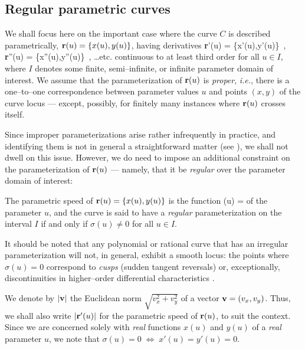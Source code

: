 \subsection{Regular parametric curves}

We shall focus here on the important case where the curve $C$
is described parametrically, ${\bf r}(u)=\{x(u),y(u)\}$, having
derivatives
\be \label{derivs}
{\bf r}'(u) = \{x'(u),y'(u)\} \,, \quad
{\bf r}''(u) = \{x''(u),y''(u)\} \,, \quad
\ldots {\rm etc.}
\ee
continuous to at least third order for all $u \in I$, where $I$
denotes some finite, semi--infinite, or infinite parameter domain
of interest. We assume that the parameterization of ${\bf r}(u)$
is {\it proper}, {\it i.e.}, there is a one--to--one correspondence
between parameter values $u$ and points $(x,y)$ of the curve
locus --- except, possibly, for finitely many instances where
${\bf r}(u)$ crosses itself.

Since improper parameterizations arise rather infrequently in
practice, and identifying them is not in general a straightforward
matter (see \cite{sederberg84,sederberg86}), we shall not dwell on
this issue. However, we do need to impose an additional constraint
on the parameterization of ${\bf r}(u)$ --- namely, that it be
{\it regular\/} over the parameter domain of interest:

\begin{dfn}
The parametric speed of ${\bf r}(u)=\{x(u),y(u)\}$ is the
function
\be \label{sigma}
\sigma(u) = 
\ee
of the parameter $u$, and the curve is said to have a {\it
regular\/} parameterization on the interval $I$ if and only if
$\sigma(u)\not=0$ for all $u \in I$.
\end{dfn}

It should be noted that any polynomial or rational curve that
has an irregular parameterization will not, in general, exhibit
a smooth locus: the points where $\sigma(u)=0$ correspond to
{\it cusps\/} (sudden tangent reversals) or, exceptionally,
discontinuities in higher--order differential characteristics
\cite{farouki91b}.

We denote by $|{\bf v}|$ the Euclidean norm $\sqrt{v_x^2
+v_y^2}$ of a vector ${\bf v}=(v_x,v_y)$. Thus, we shall also
write $|{\bf r}'(u)|$ for the parametric speed of ${\bf r}(u)$,
to suit the context. Since we are concerned solely with {\it
real\/} functions $x(u)$ and $y(u)$ of a {\it real\/} parameter
$u$, we note that $\sigma(u)=0\;\Longleftrightarrow\;x'(u)=
y'(u)=0$.

